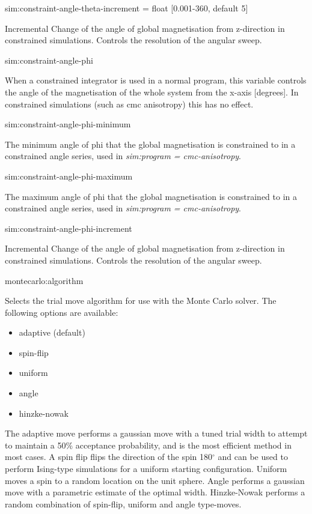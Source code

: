 {\zicf  sim:constraint-angle-theta-increment = float [0.001-360, default 5]} Incremental Change of the angle of global magnetisation from z-direction in constrained simulations. Controls the resolution of the angular sweep.

{\zicf sim:constraint-angle-phi} When a constrained integrator is used in a normal program, this variable controls the angle of the magnetisation of the whole system from the x-axis [degrees]. In constrained simulations (such as cmc anisotropy) this has no effect.

{\zicf sim:constraint-angle-phi-minimum} The minimum angle of phi that the global magnetisation is constrained to in a constrained angle series, used in \textit{sim:program = cmc-anisotropy}.

{\zicf sim:constraint-angle-phi-maximum} The maximum angle of phi that the global magnetisation is constrained to in a constrained angle series, used in \textit{sim:program = cmc-anisotropy}.

{\zicf sim:constraint-angle-phi-increment} Incremental Change of the angle of global magnetisation from z-direction in constrained simulations. Controls the resolution of the angular sweep.

{\zicf montecarlo:algorithm}
Selects the trial move algorithm for use with the Monte Carlo solver. The
following options are available:

\begin{itemize}
  \item[] adaptive (default)
  \item[] spin-flip
  \item[] uniform
  \item[] angle
  \item[] hinzke-nowak
\end{itemize}

The adaptive move performs a gaussian move with a tuned trial width to attempt
to maintain a 50\% acceptance probability, and is the most efficient method in
most cases. A spin flip flips the direction of the spin 180$^{\circ}$ and can be
used to perform Ising-type simulations for a uniform starting configuration.
Uniform moves a spin to a random location on the unit sphere. Angle performs a
gaussian move with a parametric estimate of the optimal width. Hinzke-Nowak
performs a random combination of spin-flip, uniform and angle type-moves.

